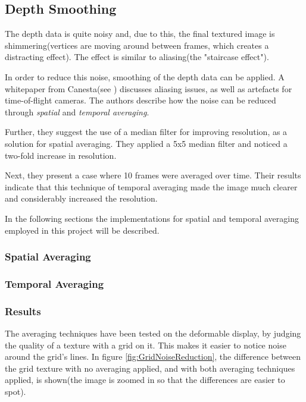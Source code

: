 \documentclass[]{article}
\begin{document}
\subsection{Depth Smoothing}

The depth data is quite noisy and, due to this, the final textured image is shimmering(vertices are moving around between frames, which creates a distracting effect). The effect is similar to aliasing(the "staircase effect").

In order to reduce this noise, smoothing of the depth data can be applied. A whitepaper from Canesta(see \cite{gokturk}) discusses aliasing issues, as well as artefacts for time-of-flight cameras. The authors describe how the noise can be reduced through \textit{spatial} and \textit{temporal averaging}. 

Further, they suggest the use of a median filter for improving resolution, as a solution for spatial averaging. They applied a 5x5 median filter and noticed a two-fold increase in resolution. 

Next, they present a case where 10 frames were averaged over time. Their results indicate that this technique of temporal averaging made the image much clearer and considerably increased the resolution.

In the following sections the implementations for spatial and temporal averaging employed in this project will be described.

\subsubsection{Spatial Averaging}
\subsubsection{Temporal Averaging}
\subsubsection{Results}

The averaging techniques have been tested on the deformable display, by judging the quality of a texture with a grid on it. This makes it easier to notice noise around the grid's lines. In figure \ref{fig:GridNoiseReduction}, the difference between the grid texture with no averaging applied, and with both averaging techniques applied, is shown(the image is zoomed in so that the differences are easier to spot).
\end{document}
